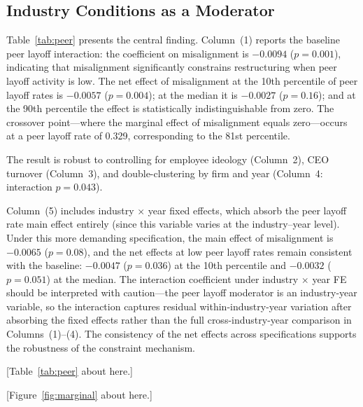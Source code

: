 \subsection{Industry Conditions as a Moderator}

Table~\ref{tab:peer} presents the central finding. Column~(1) reports
the baseline peer layoff interaction: the coefficient on misalignment
is $-0.0094$ ($p = 0.001$), indicating that misalignment significantly
constrains restructuring when peer layoff activity is low. The net
effect of misalignment at the 10th percentile of peer layoff rates is
$-0.0057$ ($p = 0.004$); at the median it is $-0.0027$ ($p = 0.16$);
and at the 90th percentile the effect is statistically indistinguishable
from zero. The crossover point---where the marginal effect of
misalignment equals zero---occurs at a peer layoff rate of 0.329,
corresponding to the 81st percentile.

The result is robust to controlling for employee ideology (Column~2),
CEO turnover (Column~3), and double-clustering by firm and year
(Column~4: interaction $p = 0.043$).

Column~(5) includes industry $\times$ year fixed effects, which absorb
the peer layoff rate main effect entirely (since this variable varies
at the industry--year level). Under this more demanding specification,
the main effect of misalignment is $-0.0065$ ($p = 0.08$), and the
net effects at low peer layoff rates remain consistent with the baseline:
$-0.0047$ ($p = 0.036$) at the 10th percentile and $-0.0032$
($p = 0.051$) at the median. The interaction coefficient under
industry $\times$ year FE should be interpreted with caution---the
peer layoff moderator is an industry-year variable, so the interaction
captures residual within-industry-year variation after absorbing the
fixed effects rather than the full cross-industry-year comparison in
Columns~(1)--(4). The consistency of the net effects across
specifications supports the robustness of the constraint mechanism.

[Table~\ref{tab:peer} about here.]

[Figure~\ref{fig:marginal} about here.]


